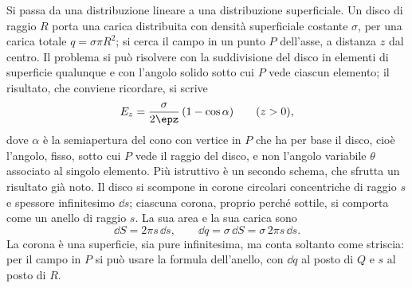 \documentclass[main.tex]{subfiles}
\begin{document}
Si passa da una distribuzione lineare a una distribuzione superficiale. Un disco di raggio $R$ porta una carica distribuita con densità superficiale costante $\sigma$, per una carica totale $q=\sigma\pi R^2$; si cerca il campo in un punto $P$ dell'asse, a distanza $z$ dal centro. Il problema si può risolvere con la suddivisione del disco in elementi di superficie qualunque e con l'angolo solido sotto cui $P$ vede ciascun elemento; il risultato, che conviene ricordare, si scrive
\[
E_z=\frac{\sigma}{2\epz}\,(1-\cos\alpha)\qquad(z>0),
\]
dove $\alpha$ è la semiapertura del cono con vertice in $P$ che ha per base il disco, cioè l'angolo, fisso, sotto cui $P$ vede il raggio del disco, e non l'angolo variabile $\theta$ associato al singolo elemento. Più istruttivo è un secondo schema, che sfrutta un risultato già noto. Il disco si scompone in corone circolari concentriche di raggio $s$ e spessore infinitesimo $\dd s$; ciascuna corona, proprio perché sottile, si comporta come un anello di raggio $s$. La sua area e la sua carica sono
\[
\dd S=2\pi s\,\dd s, \qquad \dd q=\sigma\,\dd S=\sigma\,2\pi s\,\dd s .
\]
La corona è una superficie, sia pure infinitesima, ma conta soltanto come striscia: per il campo in $P$ si può usare la formula dell'anello, con $\dd q$ al posto di $Q$ e $s$ al posto di $R$.
\end{document}
